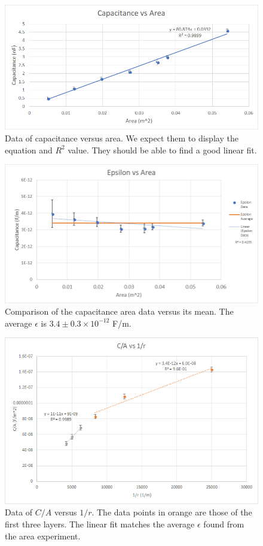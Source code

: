 \documentclass[12pt]{report}
\begin{document}
\begin{figure}[h]
\includegraphics[width=\textwidth]{lab1-results-area}
\caption{Data of capacitance versus area. We expect them to display the equation and $R^2$ value. They should be able to find a good linear fit.}
\label{Fig:Lab1-results-area}
\end{figure}
\begin{figure}[h]
\includegraphics[width=\textwidth]{lab1-results-area2}
\caption{Comparison of the capacitance area data versus its mean. The average $\epsilon$ is $3.4 \pm 0.3 \times 10^{-12}$ F/m.}
\label{Fig:Lab1-results-area2}
\end{figure}
\begin{figure}[h]
\includegraphics[width=\textwidth]{lab1-results-distance}
\caption{Data of $C/A$ versus $1/r$. The data points in orange are those of the first three layers. The linear fit matches the average $\epsilon$ found from the area experiment.}
\label{Fig:Lab1-results-distance}
\end{figure}
\end{document}
